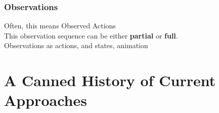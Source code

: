 \documentclass[usenames,dvipsnames]{beamer}
\newcommand{\todo}[1]{ {\color{red} #1} }
\begin{document}
	\begin{frame}[c]\frametitle{Observations}
		Often, this means Observed Actions\\
        This observation sequence can be either \textbf{partial} or \textbf{full}.\\
            \todo{Observations as actions, and states, animation}
	\end{frame}
\fi


\section{A Canned History of Current Approaches}

\end{document}

